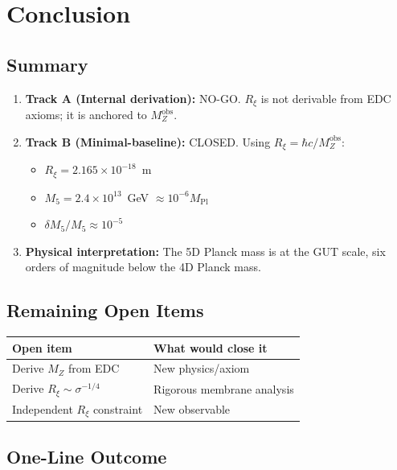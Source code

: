 \documentclass[11pt,a4paper]{article}
\newcommand{\Mpl}{M_{\text{Pl}}}
\newcommand{\Mfive}{M_5}
\newcommand{\MZ}{M_Z}
\newcommand{\Rxi}{R_\xi}
\newcommand{\obs}{\text{obs}}
\begin{document}
\section{Conclusion}
\label{sec:conclusion}

\subsection{Summary}

\begin{enumerate}
    \item \textbf{Track A (Internal derivation):} NO-GO.
          $\Rxi$ is not derivable from EDC axioms; it is anchored to $\MZ^{\obs}$.

    \item \textbf{Track B (Minimal-baseline):} CLOSED.
          Using $\Rxi = \hbar c/\MZ^{\obs}$:
          \begin{itemize}
              \item $\Rxi = 2.165 \times 10^{-18}$~m
              \item $\Mfive = 2.4 \times 10^{13}$~GeV $\approx 10^{-6}\Mpl$
              \item $\delta\Mfive/\Mfive \approx 10^{-5}$
          \end{itemize}

    \item \textbf{Physical interpretation:} The 5D Planck mass is at the GUT scale,
          six orders of magnitude below the 4D Planck mass.
\end{enumerate}

\subsection{Remaining Open Items}

\begin{center}
\begin{tabular}{@{}ll@{}}
\toprule
\textbf{Open item} & \textbf{What would close it} \\
\midrule
Derive $\MZ$ from EDC & New physics/axiom \\
Derive $\Rxi \sim \sigma^{-1/4}$ & Rigorous membrane analysis \\
Independent $\Rxi$ constraint & New observable \\
\bottomrule
\end{tabular}
\end{center}

\subsection{One-Line Outcome}
\end{document}
